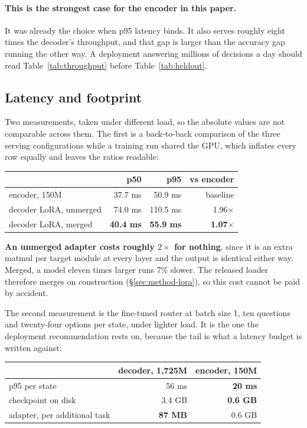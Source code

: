 \paragraph{This is the strongest case for the encoder in this paper.} It
was already the choice when p95 latency binds. It also serves roughly
eight times the decoder's throughput, and that gap is larger than the
accuracy gap running the other way. A deployment answering millions of
decisions a day should read Table~\ref{tab:throughput} before
Table~\ref{tab:heldout}.

\subsection{Latency and footprint}
\label{sec:res-latency}

Two measurements, taken under different load, so the absolute values are
not comparable across them. The first is a back-to-back comparison of the
three serving configurations while a training run shared the GPU, which
inflates every row equally and leaves the ratios readable:

\begin{center}
\begin{tabular}{lrrr}
\toprule
 & p50 & p95 & vs encoder \\
\midrule
encoder, 150M             & 37.7 ms & 50.9 ms & baseline \\
decoder LoRA, unmerged    & 74.0 ms & 110.5 ms & 1.96$\times$ \\
decoder LoRA, merged      & \textbf{40.4 ms} & \textbf{55.9 ms} & \textbf{1.07$\times$} \\
\bottomrule
\end{tabular}
\end{center}

\textbf{An unmerged adapter costs roughly $2\times$ for nothing}, since it
is an extra matmul per target module at every layer and the output is
identical either way. Merged, a model eleven times larger runs 7\% slower.
The released loader therefore merges on construction
(\S\ref{sec:method-lora}), so this cost cannot be paid by accident.

The second measurement is the fine-tuned router at batch size 1, ten
questions and twenty-four options per state, under lighter load. It is the
one the deployment recommendation rests on, because the tail is what a
latency budget is written against:

\begin{center}
\begin{tabular}{lrr}
\toprule
 & decoder, 1{,}725M & encoder, 150M \\
\midrule
p95 per state & 56 ms & \textbf{20 ms} \\
checkpoint on disk & 3.4 GB & \textbf{0.6 GB} \\
adapter, per additional task & \textbf{87 MB} & 0.6 GB \\
\bottomrule
\end{tabular}
\end{center}

